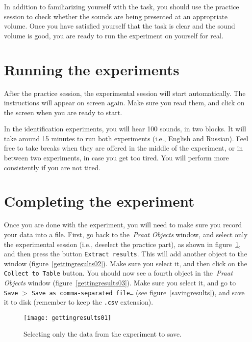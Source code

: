 \documentclass{article}
\newcommand{\soft}[1]{\textsf{#1}}
\newcommand{\filefmat}[1]{\texttt{#1}}
\newcommand{\softmenu}[1]{\texttt{#1}}
\newcommand{\Praat}{\soft{Praat}}
\begin{document}
In addition to familiarizing yourself with the task, you should use the practice session to check whether the sounds are being presented at an appropriate volume. Once you have satisfied yourself that the task is clear and the sound volume is good, you are ready to run the experiment on yourself for real.

\section{Running the experiments}

After the practice session, the experimental session will start automatically. The instructions will appear on screen again. Make sure you read them, and click on the screen when you are ready to start.

In the identification experiments, you will hear 100 sounds, in two blocks. It will take around 15 minutes to run both experiments (i.e., English and Russian). Feel free to take breaks when they are offered in the middle of the experiment, or in between two experiments, in case you get too tired. You will perform more consistently if you are not tired. 

\section{Completing the experiment}

Once you are done with the experiment, you will need to make sure you record your data into a file. First, go back to the~\emph{\Praat{} Objects} window, and select only the experimental session (i.e., deselect the practice part), as shown in figure~\ref{gettingresults01}, and then press the button \softmenu{Extract results}. This will add another object to the window (figure~\ref{gettingresults02}). Make sure you select it, and then click on the \softmenu{Collect to Table} button. You should now see a fourth object in the~\emph{\Praat{} Objects} window (figure~\ref{gettingresults03}). Make sure you select it, and go to \softmenu{Save} $>$ \softmenu{Save as comma-separated file\ldots} (see figure~\ref{savingresults}), and save it to disk (remember to keep the \filefmat{.csv} extension).

\begin{figure}[!tbp]
\caption{Selecting only the data from the experiment to save.}
\label{gettingresults01}
	\begin{center}
		\texttt{[image: gettingresults01]}
	\end{center}
\end{figure}
\end{document}
